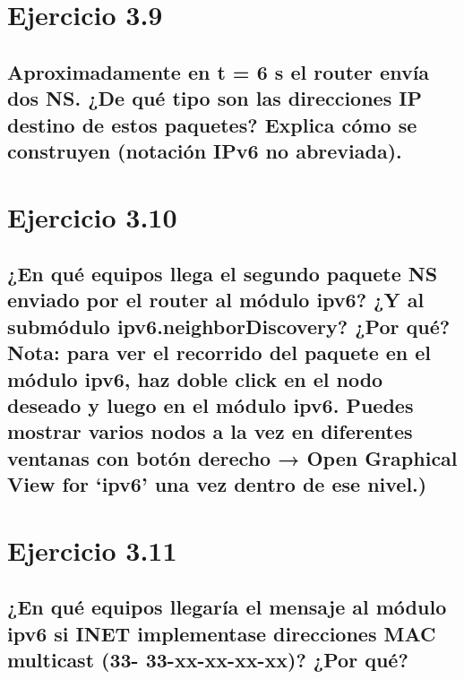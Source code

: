 \section{Ejercicio 3.9}
\subsection{ Aproximadamente en t = 6 s el router envía dos NS. ¿De qué tipo son las direcciones IP destino de estos
paquetes? Explica cómo se construyen (notación IPv6 no abreviada).}

\section{Ejercicio 3.10}
\subsection{¿En qué equipos llega el segundo paquete NS enviado por el router al módulo ipv6? ¿Y al submódulo
ipv6.neighborDiscovery? ¿Por qué? Nota: para ver el recorrido del paquete en el módulo ipv6, haz doble click en
el nodo deseado y luego en el módulo ipv6. Puedes mostrar varios nodos a la vez en diferentes ventanas con
botón derecho → Open Graphical View for ‘ipv6’ una vez dentro de ese nivel.)}

\section{Ejercicio 3.11}
\subsection{¿En qué equipos llegaría el mensaje al módulo ipv6 si INET implementase direcciones MAC multicast (33-
33-xx-xx-xx-xx)? ¿Por qué?}